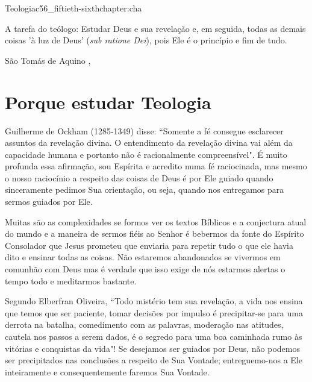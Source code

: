 \begin{chapterpage}{Teologia}{c56_fiftieth-sixthchapter:cha}
 
\begin{myquotation}A tarefa do teólogo: Estudar Deus e sua revelação e, em seguida, todas as demais coisas 'à luz de Deus' (\textit{sub ratione Dei}), pois Ele é o princípio e fim de tudo.
\par\vspace*{15mm}
\mbox{}\hfill \emdash{}São Tomás de Aquino
, %
\par\end{myquotation}

\end{chapterpage}



\section{Porque estudar Teologia}\label{c1_basicformatting:sec}

\emdash{}Guilherme de Ockham (1285-1349) disse: ``Somente a fé consegue esclarecer assuntos da revelação divina. O entendimento da revelação divina vai além da capacidade humana e portanto não é racionalmente compreensível". É muito profunda essa afirmação, sou Espírita e acredito numa fé raciocinada, mas mesmo o nosso raciocínio a respeito das coisas de Deus é por Ele guiado quando sinceramente pedimos Sua orientação, ou seja, quando nos entregamos para sermos guiados por Ele.

\emdash{}Muitas são as complexidades se formos ver os textos Bíblicos e a conjectura atual do mundo e a maneira de sermos fiéis ao Senhor é bebermos da fonte do Espírito Consolador que Jesus prometeu que enviaria para repetir tudo o que ele havia dito e ensinar todas as coisas. Não estaremos abandonados se vivermos em comunhão com Deus mas é verdade que isso exige de nós estarmos alertas o tempo todo e meditarmos bastante.

\emdash{}Segundo Elberfran Oliveira, ``Todo mistério tem sua revelação, a vida nos ensina que temos que ser paciente, tomar decisões por impulso é precipitar-se para uma derrota na batalha, comedimento com as palavras, moderação nas atitudes, cautela nos passos a serem dados, é o segredo para uma boa caminhada rumo às vitórias e conquistas da vida"! Se desejamos ser guiados por Deus, não podemos ser precipitados nas conclusões a respeito de Sua Vontade; entreguemo-nos a Ele inteiramente e consequentemente faremos Sua Vontade.


